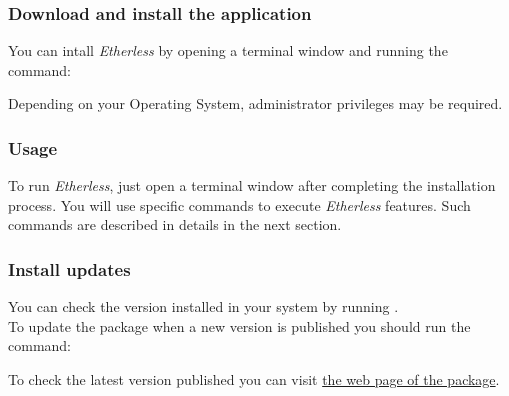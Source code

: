     \subsubsection{Download and install the application}
    You can intall \textit{Etherless} by opening a terminal window and running the command:
     \begin{center}
     \end{center}
     Depending on your Operating System, administrator privileges may be required. \\
         \subsubsection{Usage}
      To run \textit{Etherless}, just open a terminal window after completing the installation process. You will use specific commands to execute \textit{Etherless} features. Such commands are described in details in the next section.
      
     \subsubsection{Install updates}
     You can check the version installed in your system by running . \\
     To update the package when a new version is published you should run the command:
	\begin{center}
	\end{center}
	To check the latest version published you can visit \href{https://www.npmjs.com/package/@roundabout-team/etherless-cli}{the web page of the package}.
